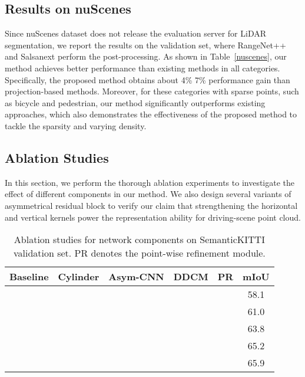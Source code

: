 \documentclass[final]{cvpr}
\newcommand{\cmark}{\textcolor{dgreen}{\text{\ding{51}}}}
\begin{document}
\subsection{Results on nuScenes}




Since nuScenes dataset does not release the evaluation server for LiDAR segmentation, we report the results on the validation set, where RangeNet++ and Salsanext perform the post-processing. As shown in Table~\ref{nuscenes}, our method achieves better performance than existing methods in all categories. Specifically, the proposed method obtains about 4\%  7\% performance gain than projection-based methods. Moreover, for these categories with sparse points, such as bicycle and pedestrian, our method significantly outperforms existing approaches, which also demonstrates the effectiveness of the proposed method to tackle the sparsity and varying density.


\subsection{Ablation Studies}

In this section, we perform the thorough ablation experiments to investigate the effect of different components in our method. We also design several variants of asymmetrical residual block to verify our claim that strengthening the horizontal and vertical kernels power the representation ability for driving-scene point cloud. 




\begin{table}[t]
\caption{Ablation studies for network components on SemanticKITTI validation set. PR denotes the point-wise refinement module.}
\label{table_net_components}
\centering
\setlength{\tabcolsep}{4.2pt}
\begin{tabular*}{1.0\linewidth}{c c c c c | c}
\hline
{Baseline} & Cylinder & {Asym-CNN} & {DDCM} & {PR} & {mIoU} \\
\hline
\hline
{\cmark} & & & & & 58.1 \\
\cmark & \cmark & & & & 61.0 \\
\cmark & \cmark & \cmark & & & 63.8\\
\cmark & \cmark & \cmark & \cmark & & 65.2 \\
\cmark & \cmark & \cmark & \cmark & \cmark & 65.9 \\
\hline
\end{tabular*}
\end{table}
\end{document}
